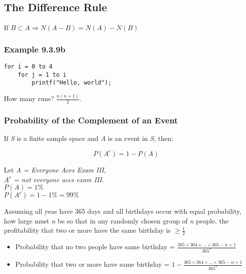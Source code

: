 \documentclass{article}
\begin{document}
\subsection{The Difference Rule}
If $B \subset A \Rightarrow N(A - B) = N(A) - N(B)$

\subsubsection*{Example 9.3.9b}
\begin{verbatim}
for i = 0 to 4
    for j = 1 to i
        printf("Hello, world");
\end{verbatim}

How many runs? $\frac{n(n + 1)}{2}$.

\subsubsection{Probability of the Complement of an Event}
If \textit{S} is a finite sample space and \textit{A} is an event in \textit{S}, then:

\begin{equation*}
P(A^c) = 1 - P(A)
\end{equation*}

Let \textit{A = Everyone Aces Exam III}, \\ $A^c$ \textit{= not everyone aces exam III}. \\ $P(A) = 1\% $ \\ $P(A^c) = 1 - 1\% = 99\% $

Assuming all yeas have 365 days and all birthdays occur with equal probability, how large must \textit{n} be so that in any randomly chosen group of \textit{n} people, the profitability that two or more have the same birthday is $\geq \frac{1}{2}$

\begin{itemize}
\item Probability that no two people have same birthday = $\frac{365 \times 364 \times \ldots \times 365 - n + 1}{365^n}$
\item Probability that two or more have same birthday = $1 - \frac{365 \times 364 \times \ldots \times 365 - n + 1}{365^n}$
\end{itemize}
\end{document}

